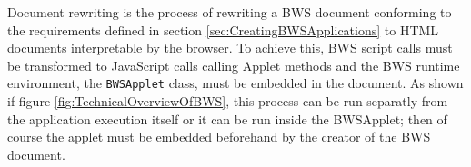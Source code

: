 Document rewriting is the process of rewriting a BWS document conforming to the requirements defined in section \ref{sec:CreatingBWSApplications} to HTML documents interpretable by the browser. To achieve this, BWS script calls must be transformed to JavaScript calls calling Applet methods and the BWS runtime environment, the \texttt{BWSApplet} class, must be embedded in the document. As shown if figure \ref{fig:TechnicalOverviewOfBWS}, this process can be run separatly from the application execution itself or it can be run inside the BWSApplet; then of course the applet must be embedded beforehand by the creator of the BWS document.